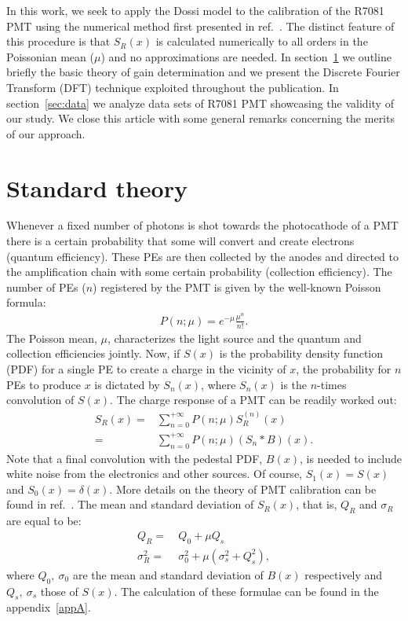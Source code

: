 \documentclass[a4paper,11pt]{article}
\begin{document}
In this work, we seek to apply the Dossi model to the calibration of the R7081 PMT using the numerical method first presented in ref.~\cite{me}. 
The distinct feature of this procedure is that $S_R(x)$ is calculated numerically to all orders in the Poissonian mean ($\mu$) and no approximations are needed. 
In section~\ref{sec:theo} we outline briefly the basic theory of gain determination and we present the Discrete Fourier Transform (DFT) technique exploited throughout the publication. 
In section~\ref{sec:data} we analyze data sets of R7081 PMT showcasing the validity of our study. 
We close this article with some general remarks concerning the merits of our approach.


\section{Standard theory}
\label{sec:theo}


Whenever a fixed number of photons is shot towards the photocathode of a PMT there is a certain probability that some will convert and create electrons (quantum efficiency). 
These PEs are then collected by the anodes and directed to the amplification chain with some certain probability (collection efficiency). 
The number of PEs ($n$) registered by the PMT is given by the well-known Poisson formula:
\begin{align}
P(n;\mu) = e^{-\mu}\frac{\mu^n}{n!}.
\end{align}
The Poisson mean, $\mu$, characterizes the light source and the quantum and collection efficiencies jointly. 
Now, if $S(x)$ is the probability density function (PDF) for a single PE to create a charge in the vicinity of $x$, 
the probability for $n$ PEs to produce $x$ is dictated by $S_n(x)$, where $S_n(x)$ is the $n$-times convolution of $S(x)$. 
The charge response of a PMT can be readily worked out:
\begin{align}
S_R(x) = &\sum_{n=0}^{+\infty} P(n;\mu)   S^{(n)}_R(x) \nonumber \\
            = & \sum_{n=0}^{+\infty} P(n;\mu) (S_n*B)(x). \label{eq:sr}
\end{align}
Note that a final convolution with the pedestal PDF, $B(x)$, is needed to include white noise from the electronics and other sources. 
Of course, $S_1(x)=S(x)$ and $S_0(x)=\delta(x)$. More details on the theory of PMT calibration can be found in ref.~\cite{me}.
The mean and standard deviation of $S_R(x)$, that is, $Q_R$ and $\sigma_R$ are equal to be:
\begin{align}
Q_R  = & \ Q_0 + \mu Q_s \\
\sigma_R^2      = & \  \sigma_0^2 + \mu( \sigma_s^2 + Q_s^2 ),  
\end{align}
where $Q_0, \ \sigma_0$ are the mean and standard deviation of $B(x)$ respectively and $Q_s, \ \sigma_s$ those of $S(x)$.
The calculation of these formulae can be found in the appendix~\ref{appA}. 
\end{document}

